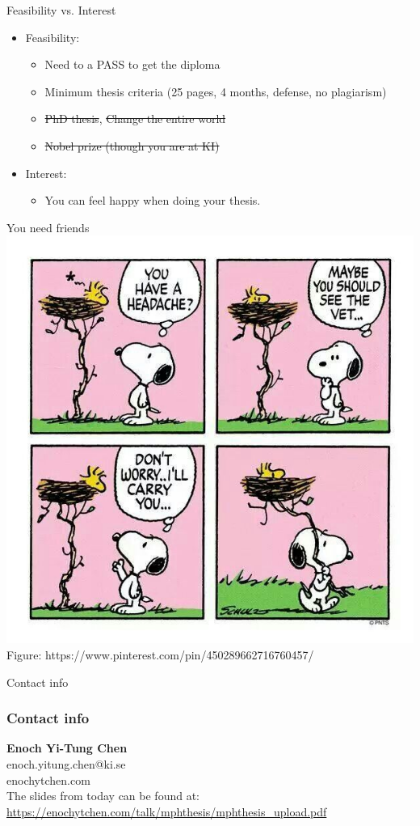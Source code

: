 \documentclass{beamer}
\begin{document}
\begin{frame}{Feasibility vs. Interest}
	\begin{itemize}
	\item Feasibility: 
	      \begin{itemize}
	      \item<1-> Need to a PASS to get the diploma
	      \item<2-> Minimum	 thesis criteria (25 pages, 4 months, defense, no plagiarism)
	      \item<3-> \st{PhD thesis}, \st{Change the entire world}
	      \item<4-> \st{Nobel prize (though you are at KI)}
	      \end{itemize}
	\item<1->  Interest:
		 \begin{itemize}
		 \item<5-> You can feel happy when doing your thesis.

		 \end{itemize}
		\end{itemize}
\end{frame}

\begin{frame}{You need friends}
	\center
	\includegraphics[scale=0.3]{image/snoopy}\\
	\small{Figure: https://www.pinterest.com/pin/450289662716760457/}
\end{frame}



\begin{frame}{Contact info}

\frametitle{Contact info}
\textbf{Enoch Yi-Tung Chen}\\

enoch.yitung.chen@ki.se\\
enochytchen.com\\

The slides from today can be found at: \url{https://enochytchen.com/talk/mphthesis/mphthesis_upload.pdf}

\end{frame}
\end{document}
